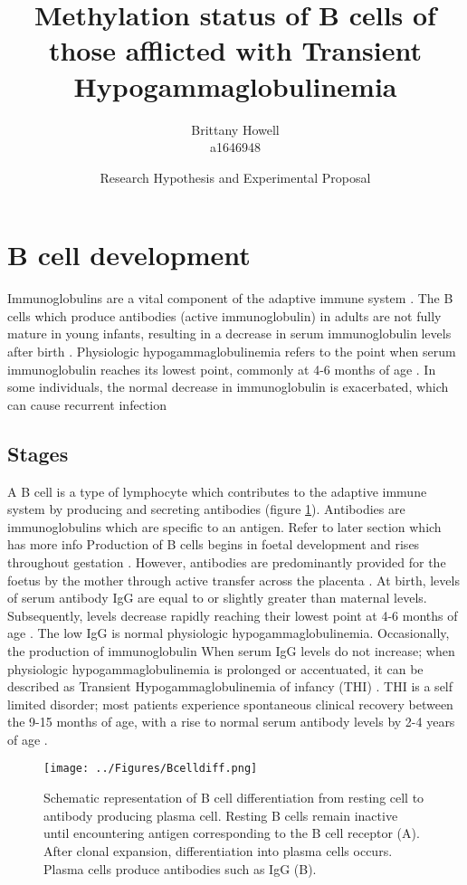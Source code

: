 \documentclass[12pt]{article}
\title{Methylation status of B cells of those afflicted with Transient Hypogammaglobulinemia}
\date{Research Hypothesis and Experimental Proposal}
\author{Brittany Howell \\ a1646948}
\begin{document}
	\maketitle
	
	\section{B cell development}
	
		Immunoglobulins are a vital component of the adaptive immune system \citep{Simon15}.  
		The B cells which produce antibodies (active immunoglobulin) in adults are not fully mature in young infants, resulting in a decrease in serum immunoglobulin levels after birth \citep{Martin10}. 
		Physiologic hypogammaglobulinemia refers to the point when serum immunoglobulin reaches its lowest point, commonly at 4-6 months of age \citep{Dressler89}. 
		In some individuals, the normal decrease in immunoglobulin is exacerbated, which can cause recurrent infection
	
	\subsection{Stages}
	
	A B cell is a type of lymphocyte which contributes to the adaptive immune system by producing and secreting antibodies \citep{Cooper15} (figure \ref{fig:BcellDiff}).
	Antibodies are immunoglobulins which are specific to an antigen.
	{\Huge Refer to later section which has more info}
	Production of B cells begins in foetal development and rises throughout gestation \citep{Rechavi15}.
	However, antibodies are predominantly provided for the foetus by the mother through active transfer across the placenta \citep{Kohler66, Dalal98}.
	At birth, levels of serum antibody IgG are equal to or slightly greater than maternal levels. 
	Subsequently, levels decrease rapidly reaching their lowest point at 4-6 months of age \citep{Dressler89}.
	The low IgG is normal physiologic hypogammaglobulinemia.
	Occasionally, the production of immunoglobulin 
	When serum IgG levels do not increase; when physiologic hypogammaglobulinemia is prolonged or accentuated, it can be described as Transient Hypogammaglobulinemia of infancy (THI) \citep{Gitlin56}.
	THI is a self limited disorder; most patients experience spontaneous clinical recovery between the 9-15 months of age, with a rise to normal serum antibody levels by 2-4 years of age \citep{Rosen66}.
	
	\begin{figure}[tbh]
		\centering
		\texttt{[image: ../Figures/Bcelldiff.png]}
		\caption{Schematic representation of B cell differentiation from resting cell to antibody producing plasma cell. Resting B cells remain inactive until encountering antigen corresponding to the B cell receptor (A). After clonal expansion, differentiation into plasma cells occurs. Plasma cells produce antibodies such as IgG (B).}
		\label{fig:BcellDiff}
	\end{figure}
	
\end{document}
